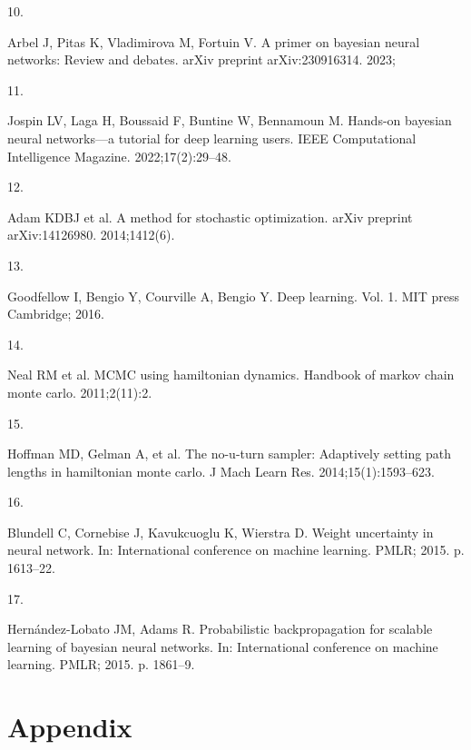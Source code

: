 \documentclass[
  a4paper,
]{scrreprt}
\newlength{\cslhangindent}
\newlength{\csllabelwidth}
\newenvironment{CSLReferences}[2] %
 {\begin{list}{}{%
  \setlength{\itemindent}{0pt}
  \setlength{\leftmargin}{0pt}
  \setlength{\parsep}{0pt}
  \ifodd #1
   \setlength{\leftmargin}{\cslhangindent}
   \setlength{\itemindent}{-1\cslhangindent}
  \fi
  \setlength{\itemsep}{#2\baselineskip}}}
 {\end{list}}
\newcommand{\CSLLeftMargin}[1]{\parbox[t]{\csllabelwidth}{\strut#1\strut}}
\newcommand{\CSLRightInline}[1]{\parbox[t]{\linewidth - \csllabelwidth}{\strut#1\strut}}
\begin{document}
\begin{CSLReferences}{0}{1}
\CSLLeftMargin{10. }%
\CSLRightInline{Arbel J, Pitas K, Vladimirova M, Fortuin V. A primer on
bayesian neural networks: Review and debates. arXiv preprint
arXiv:230916314. 2023; }

\CSLLeftMargin{11. }%
\CSLRightInline{Jospin LV, Laga H, Boussaid F, Buntine W, Bennamoun M.
Hands-on bayesian neural networks---a tutorial for deep learning users.
IEEE Computational Intelligence Magazine. 2022;17(2):29--48. }

\CSLLeftMargin{12. }%
\CSLRightInline{Adam KDBJ et al. A method for stochastic optimization.
arXiv preprint arXiv:14126980. 2014;1412(6). }

\CSLLeftMargin{13. }%
\CSLRightInline{Goodfellow I, Bengio Y, Courville A, Bengio Y. Deep
learning. Vol. 1. MIT press Cambridge; 2016. }

\CSLLeftMargin{14. }%
\CSLRightInline{Neal RM et al. MCMC using hamiltonian dynamics. Handbook
of markov chain monte carlo. 2011;2(11):2. }

\CSLLeftMargin{15. }%
\CSLRightInline{Hoffman MD, Gelman A, et al. The no-u-turn sampler:
Adaptively setting path lengths in hamiltonian monte carlo. J Mach Learn
Res. 2014;15(1):1593--623. }

\CSLLeftMargin{16. }%
\CSLRightInline{Blundell C, Cornebise J, Kavukcuoglu K, Wierstra D.
Weight uncertainty in neural network. In: International conference on
machine learning. PMLR; 2015. p. 1613--22. }

\CSLLeftMargin{17. }%
\CSLRightInline{Hernández-Lobato JM, Adams R. Probabilistic
backpropagation for scalable learning of bayesian neural networks. In:
International conference on machine learning. PMLR; 2015. p. 1861--9. }

\end{CSLReferences}


\chapter*{Appendix}\label{appendix}

\end{document}
